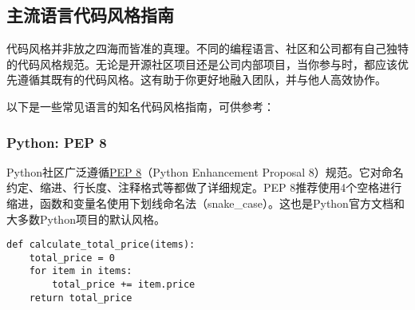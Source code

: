 \subsection{主流语言代码风格指南}

代码风格并非放之四海而皆准的真理。不同的编程语言、社区和公司都有自己独特的代码风格规范。无论是开源社区项目还是公司内部项目，当你参与时，都应该优先遵循其既有的代码风格。这有助于你更好地融入团队，并与他人高效协作。

以下是一些常见语言的知名代码风格指南，可供参考：

\subsubsection{Python: PEP 8}
Python社区广泛遵循\href{https://www.python.org/dev/peps/pep-0008/}{PEP 8}（Python Enhancement Proposal 8）规范。它对命名约定、缩进、行长度、注释格式等都做了详细规定。PEP 8推荐使用4个空格进行缩进，函数和变量名使用下划线命名法（snake\_case）。这也是Python官方文档和大多数Python项目的默认风格。
\begin{lstlisting}
def calculate_total_price(items):
    total_price = 0
    for item in items:
        total_price += item.price
    return total_price
\end{lstlisting}

